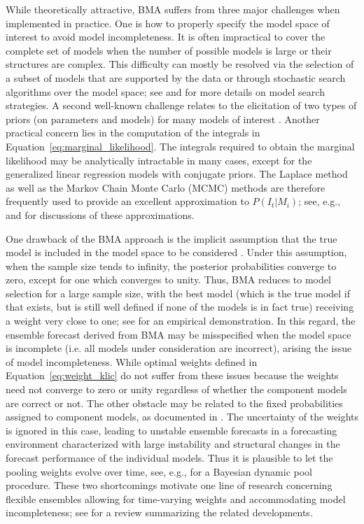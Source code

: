 \documentclass[11pt]{article}
\begin{document}
While theoretically attractive, BMA suffers from three major challenges when implemented in practice. One is how to properly specify the model space of interest to avoid model incompleteness. It is often impractical to cover the complete set of models when the number of possible models is large or their structures are complex. This difficulty can mostly be resolved via the selection of a subset of models that are supported by the data or through stochastic search algorithms over the model space; see \cite{Hoeting1999-qn} and \cite{Koop2003-nl} for more details on model search strategies. A second well-known challenge relates to the elicitation of two types of priors (on parameters and models) for many models of interest \citep{Moral-Benito2015-zh,Aastveit2018-lf}. Another practical concern lies in the computation of the integrals in Equation~\eqref{eq:marginal_likelihood}. The integrals required to obtain the marginal likelihood may be analytically intractable in many cases, except for the generalized linear regression models with conjugate priors. The Laplace method as well as the Markov Chain Monte Carlo (MCMC) methods are therefore frequently used to provide an excellent approximation to $P(I_{t}|M_{i})$; see, e.g., \cite{Hoeting1999-qn} and \cite{Bassetti2020-uh} for discussions of these approximations.

One drawback of the BMA approach is the implicit assumption that the true model is included in the model space to be considered \citep{Wright2008-bs}. Under this assumption, when the sample size tends to infinity, the posterior probabilities converge to zero, except for one which converges to unity. Thus, BMA reduces to model selection for a large sample size, with the best model (which is the true model if that exists, but is still well defined if none of the models is in fact true) receiving a weight very close to one; see \cite{Geweke2010-zn} for an empirical demonstration. In this regard, the ensemble forecast derived from BMA may be misspecified when the model space is incomplete (i.e. all models under consideration are incorrect), arising the issue of model incompleteness. While optimal weights defined in Equation~\eqref{eq:weight_klic} do not suffer from these issues because the weights need not converge to zero or unity regardless of whether the component models are correct or not. The other obstacle may be related to the fixed probabilities assigned to component models, as documented in \cite{Aastveit2018-lf}. The uncertainty of the weights is ignored in this case, leading to unstable ensemble forecasts in a forecasting environment characterized with large instability and structural changes in the forecast performance of the individual models. Thus it is plausible to let the pooling weights evolve over time, see, e.g., \cite{Del_Negro2016-ab} for a Bayesian dynamic pool procedure. These two shortcomings motivate one line of research concerning flexible ensembles allowing for time-varying weights and accommodating model incompleteness; see \cite{Aastveit2018-lf} for a review summarizing the related developments.
\end{document}
